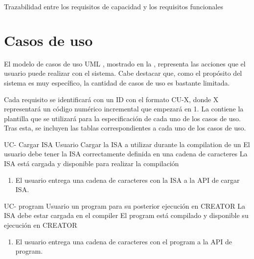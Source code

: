     {Trazabilidad entre los requisitos de capacidad y los requisitos funcionales}

\FloatBarrier

\section{Casos de uso}\label{sec:usecases}

El modelo de casos de uso UML \parencite{UMLSpec}, mostrado en la
, representa las acciones que el usuario puede realizar con
el sistema. Cabe destacar que, como el propósito del sistema es muy específico,
la cantidad de casos de uso es bastante limitada.


Cada requisito se identificará con un ID con el formato CU-X, donde X
representará un código numérico incremental que empezará en 1. La
 contiene la plantilla que se utilizará para la
especificación de cada uno de los casos de uso. Tras esta, se incluyen las tablas
correspondientes a cada uno de los casos de uso.


\setcounter{i}{1}


\begin{useCase}{UC-}
    {Cargar \gls{ISA}} %
    {Usuario} %
    {Cargar la \gls{ISA} a utilizar durante la \gls{compilation} de un } %
    {El usuario debe tener la \gls{ISA} correctamente definida en una cadena de caracteres} %
    {La \gls{ISA} está cargada y disponible para realizar la compilación} %
    \begin{enumerate}[leftmargin=*, topsep=0pt, noitemsep]
        \item El usuario entrega una cadena de caracteres con la
        \gls{ISA} a la \gls{API} de cargar \gls{ISA}.
    \end{enumerate}
\end{useCase}

\begin{useCase}{UC-}
    { \gls{program}} %
    {Usuario} %
    { un \gls{program} para su posterior ejecución en CREATOR} %
    {La \gls{ISA} debe estar cargada en el \gls{compiler}} %
    {El \gls{program} está compilado y disponible su ejecución en CREATOR} %
    \begin{enumerate}[leftmargin=*, topsep=0pt, noitemsep]
        \item El usuario entrega una cadena de caracteres con el \gls{program}
        a la \gls{API} de  \gls{program}.
    \end{enumerate}
\end{useCase}
